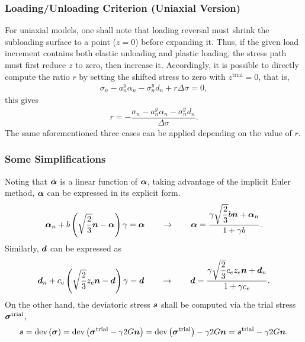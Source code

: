 \subsubsection{Loading/Unloading Criterion (Uniaxial Version)}
For uniaxial models, one shall note that loading reversal must shrink the subloading surface to a point ($z=0$) before expanding it.
Thus, if the given load increment contains both elastic unloading and plastic loading, the stress path must first reduce $z$ to zero, then increase it.
Accordingly, it is possible to directly compute the ratio $r$ by setting the shifted stress to zero with $z^\text{trial}=0$, that is,
\begin{gather}
    \sigma_n-a^y_n\alpha_n-\sigma^y_nd_n+r\Delta\sigma=0,
\end{gather}
this gives
\begin{gather}
    r=-\dfrac{\sigma_n-a^y_n\alpha_n-\sigma^y_nd_n}{\Delta\sigma}.
\end{gather}
The same aforementioned three cases can be applied depending on the value of $r$.
\subsubsection{Some Simplifications}
Noting that $\dot{\bm{\alpha}}$ is a linear function of $\bm{\alpha}$, taking advantage of the implicit Euler method, $\bm{\alpha}$ can be expressed in its explicit form.
\begin{gather}\label{eq:explicit_alpha}
    \bm{\alpha}_n+b\left(\sqrt{\dfrac{2}{3}}\bm{n}-\bm{\alpha}\right)\gamma=\bm{\alpha}\qquad\rightarrow\qquad
    \bm{\alpha}=\dfrac{\gamma\sqrt{\dfrac{2}{3}}b\bm{n}+\bm{\alpha}_n}{1+\gamma{}b}.
    \end{gather}
    Similarly, $\bm{d}$ can be expressed as
    \begin{gather}\label{eq:explicit_d}
        \bm{d}_n+c_e\left(\sqrt{\dfrac{2}{3}}z_e\bm{n}-\bm{d}\right)\gamma=\bm{d}\qquad\rightarrow\qquad\bm{d}=\dfrac{\gamma{}\sqrt{\dfrac{2}{3}}c_ez_e\bm{n}+\bm{d}_n}{1+\gamma{}c_e}.
    \end{gather}
    On the other hand, the deviatoric stress $\bm{s}$ shall be computed via the trial stress $\bm{\sigma}^\text{trial}$,
    \begin{gather}
    \bm{s}=\text{dev}\left(\bm{\sigma}\right)=\text{dev}\left(\bm{\sigma}^\text{trial}-\gamma2G\bm{n}\right)=\text{dev}\left(\bm{\sigma}^\text{trial}\right)-\gamma2G\bm{n}=\bm{s}^\text{trial}-\gamma2G\bm{n}.
\end{gather}

